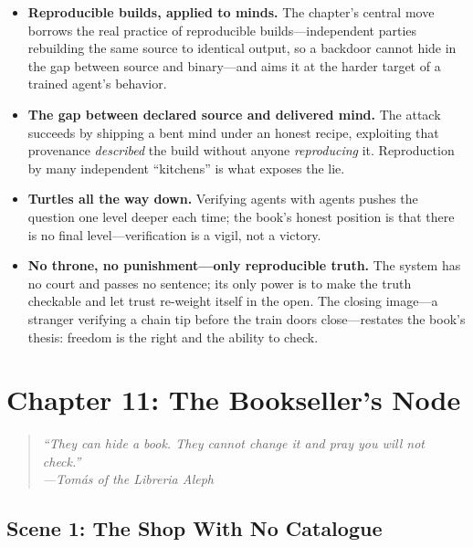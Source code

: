 \documentclass[12pt,letterpaper]{book}
\providecommand{\tightlist}{\setlength{\itemsep}{0pt}\setlength{\parskip}{0pt}}
\begin{document}
\begin{itemize}
\tightlist
\item
  \textbf{Reproducible builds, applied to minds.} The chapter's central move
  borrows the real practice of reproducible builds---independent parties
  rebuilding the same source to identical output, so a backdoor cannot hide in
  the gap between source and binary---and aims it at the harder target of a
  trained agent's behavior.
\item
  \textbf{The gap between declared source and delivered mind.} The attack
  succeeds by shipping a bent mind under an honest recipe, exploiting that
  provenance \emph{described} the build without anyone \emph{reproducing} it.
  Reproduction by many independent ``kitchens'' is what exposes the lie.
\item
  \textbf{Turtles all the way down.} Verifying agents with agents pushes the
  question one level deeper each time; the book's honest position is that there is
  no final level---verification is a vigil, not a victory.
\item
  \textbf{No throne, no punishment---only reproducible truth.} The system has no
  court and passes no sentence; its only power is to make the truth checkable and
  let trust re-weight itself in the open. The closing image---a stranger
  verifying a chain tip before the train doors close---restates the book's thesis:
  freedom is the right and the ability to check.
\end{itemize}


\hypertarget{chapter-11-the-booksellers-node}{%
\section{Chapter 11: The Bookseller's
Node}\label{chapter-11-the-booksellers-node}}

\begin{quote}
\itshape ``They can hide a book. They cannot change it and pray you will not
check.''\\
\normalfont\hfill---Tom\'as of the Libreria Aleph
\end{quote}

\hypertarget{scene-1-the-shop-with-no-catalogue}{%
\subsection{Scene 1: The Shop With No
Catalogue}\label{scene-1-the-shop-with-no-catalogue}}
\end{document}
